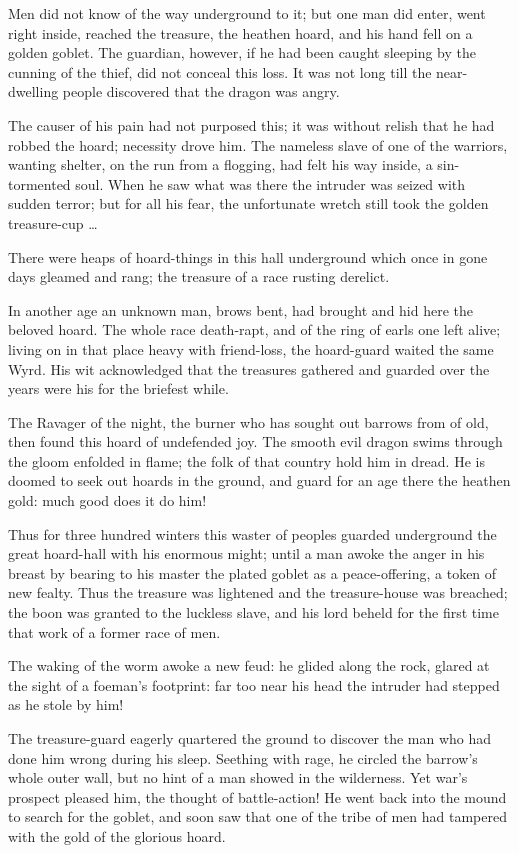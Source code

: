 \documentclass[a4paper]{article}
\begin{document}
{Men did not know
of the way underground to it; but one man did enter,
went right inside, reached the treasure,
the heathen hoard, and his hand fell
on a golden goblet. The guardian, however,
if he had been caught sleeping by the cunning of the thief,
did not conceal this loss. It was not long till the near-
dwelling people discovered that the dragon was angry.

The causer of his pain had not purposed this;
it was without relish that he had robbed the hoard;
necessity drove him. The nameless slave
of one of the warriors, wanting shelter,
on the run from a flogging, had felt his way inside,
a sin-tormented soul. When he saw what was there
the intruder was seized with sudden terror;
but for all his fear, the unfortunate wretch
still took the golden treasure-cup …

There were heaps of hoard-things in this hall underground
which once in gone days gleamed and rang;
the treasure of a race rusting derelict.

In another age an unknown man,
brows bent, had brought and hid here
the beloved hoard. The whole race
death-rapt, and of the ring of earls
one left alive; living on in that place
heavy with friend-loss, the hoard-guard
waited the same Wyrd. His wit acknowledged
that the treasures gathered and guarded over the years
were his for the briefest while.

The Ravager of the night,
the burner who has sought out barrows from of old,
then found this hoard of undefended joy.
The smooth evil dragon swims through the gloom
enfolded in flame; the folk of that country
hold him in dread. He is doomed to seek out
hoards in the ground, and guard for an age there
the heathen gold: much good does it do him!

Thus for three hundred winters this waster of peoples
guarded underground the great hoard-hall
with his enormous might; until a man awoke
the anger in his breast by bearing to his master
the plated goblet as a peace-offering,
a token of new fealty. Thus the treasure was lightened
and the treasure-house was breached; the boon was granted
to the luckless slave, and his lord beheld
for the first time that work of a former race of men.

The waking of the worm awoke a new feud:
he glided along the rock, glared at the sight
of a foeman’s footprint: far too near his head
the intruder had stepped as he stole by him!

The treasure-guard eagerly
quartered the ground to discover the man
who had done him wrong during his sleep.
Seething with rage, he circled the barrow’s
whole outer wall, but no hint of a man
showed in the wilderness. Yet war’s prospect pleased him,
the thought of battle-action! He went back into the mound
to search for the goblet, and soon saw that one
of the tribe of men had tampered with the gold
of the glorious hoard.

}
\end{document}
